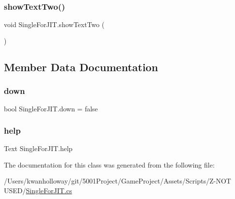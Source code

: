 \mbox{\label{class_single_for_j_i_t_adab7f17e960e7922bd9c6d52c20d9ddc}} 
\subsubsection{\texorpdfstring{show\+Text\+Two()}{showTextTwo()}}
{\footnotesize\ttfamily void Single\+For\+J\+I\+T.\+show\+Text\+Two (\begin{DoxyParamCaption}{ }\end{DoxyParamCaption})}



\subsection{Member Data Documentation}
\mbox{\label{class_single_for_j_i_t_aee228f087ebd95f4b92b6353c0297796}} 
\subsubsection{\texorpdfstring{down}{down}}
{\footnotesize\ttfamily bool Single\+For\+J\+I\+T.\+down = false}

\mbox{\label{class_single_for_j_i_t_a15ec1c2f3995f7ae8c7d22a3ad4a312e}} 
\subsubsection{\texorpdfstring{help}{help}}
{\footnotesize\ttfamily Text Single\+For\+J\+I\+T.\+help}



The documentation for this class was generated from the following file\+:\begin{DoxyCompactItemize}
\item 
/\+Users/kwanholloway/git/5001\+Project/\+Game\+Project/\+Assets/\+Scripts/\+Z-\/\+N\+O\+T U\+S\+E\+D/\hyperlink{_single_for_j_i_t_8cs}{Single\+For\+J\+I\+T.\+cs}\end{DoxyCompactItemize}
